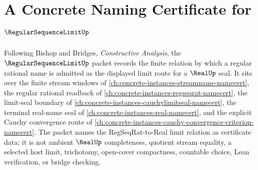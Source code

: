 \chapter{A Concrete Naming Certificate for $\RegularSequenceLimitUp$}
\label{ch:concrete-instances-regular-sequence-limit-namecert}

Following Bishop and Bridges, \emph{Constructive Analysis}, the $\RegularSequenceLimitUp$ packet records the finite relation by which a regular rational name is admitted as the displayed limit route for a $\RealUp$ seal. It sits over the finite stream windows of \autoref{ch:concrete-instances-streamname-namecert}, the regular rational readback of \autoref{ch:concrete-instances-regseqrat-namecert}, the limit-seal boundary of \autoref{ch:concrete-instances-cauchylimitseal-namecert}, the terminal real-name seal of \autoref{ch:concrete-instances-real-namecert}, and the explicit Cauchy convergence route of \autoref{ch:concrete-instances-cauchy-convergence-criterion-namecert}. The packet names the RegSeqRat-to-Real limit relation as certificate data; it is not ambient $\RealUp$ completeness, quotient stream equality, a selected host limit, trichotomy, open-cover compactness, countable choice, Lean verification, or bridge checking.


